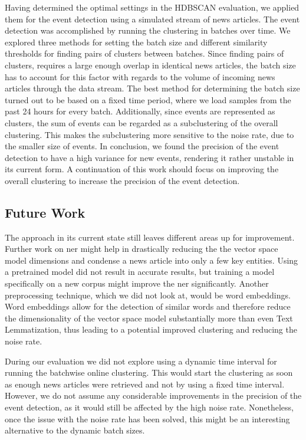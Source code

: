Having determined the optimal settings in the HDBSCAN evaluation,
we applied them for the event detection using a simulated stream of news articles.
The event detection was accomplished by running the clustering in batches over time.
We explored three methods for setting the batch size and different similarity thresholds for finding pairs of clusters between batches.
Since finding pairs of clusters, requires a large enough overlap in identical news articles,
the batch size has to account for this factor with regards to the volume of incoming news articles
through the data stream.
The best method for determining the batch size turned out to be based on a fixed time period,
where we load samples from the past 24 hours for every batch.
Additionally, since events are represented as clusters,
the sum of events can be regarded as a subclustering of the overall clustering.
This makes the subclustering more sensitive to the noise rate, due to the smaller size of events.
In conclusion, we found the precision of the event detection to have a high variance for new events,
rendering it rather unstable in its current form.
A continuation of this work should focus on improving the overall clustering to increase the precision of the event detection.

\subsection{Future Work}
\label{subsec:6_future_work}

The approach in its current state still leaves different areas up for improvement.
Further work on \Gls{ner} might help in drastically reducing the the vector space model dimensions
and condense a news article into only a few key entities.
Using a pretrained model did not result in accurate results,
but training a model specifically on a new corpus might improve the \Gls{ner} significantly.
Another preprocessing technique, which we did not look at, would be word embeddings.
Word embeddings allow for the detection of similar words and therefore reduce the dimensionality
of the vector space model substantially more than even Text Lemmatization,
thus leading to a potential improved clustering and reducing the noise rate.

During our evaluation we did not explore using a dynamic time interval for running the batchwise online clustering.
This would start the clustering as soon as enough news articles were retrieved
and not by using a fixed time interval.
However, we do not assume any considerable improvements in the precision of the event detection,
as it would still be affected by the high noise rate.
Nonetheless, once the issue with the noise rate has been solved,
this might be an interesting alternative to the dynamic batch sizes.

